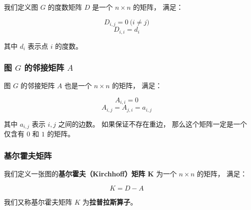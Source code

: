 \documentclass[UTF8]{article}
\begin{document}
	我们定义图 $G$ 的度数矩阵 $D$ 是一个 $n \times n$ 的矩阵，
	满足：
	
	$$
	D_{i, j} = 0 \pod {i \ne j}
	$$$$
	D_{i, i} = d_i
	$$

	其中 $d_i$ 表示点 $i$ 的度数。

	\subsubsection{图 $G$ 的邻接矩阵 $A$}

	图 $G$ 的邻接矩阵 $A$ 也是一个 $n \times n$ 的矩阵，
	满足：

	$$
	A_{i, i} = 0
	$$$$
	A_{i, j} = A_{j, i} = a_{i, j}
	$$

	其中 $a_{i, j}$ 表示 $i, j$ 之间的边数。
	如果保证不存在重边，
	那么这个矩阵一定是一个仅含有 $0$ 和 $1$ 的矩阵。

	\subsubsection{基尔霍夫矩阵}

	我们定义一张图的\textbf{基尔霍夫（Kirchhoff）矩阵 K}
	为一个 $n \times n$ 的矩阵，
	满足：

	$$
	K = D - A
	$$

	我们又称基尔霍夫矩阵 $K$ 为\textbf{拉普拉斯算子}。

	
\end{document}
